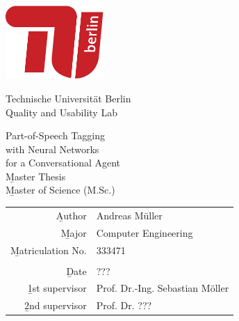 
\pagestyle{empty}

\clearscrheadings\clearscrplain
\begin{center}
\includegraphics[width=0.28\textwidth]{images/logo_tu_berlin}
\vspace{8mm}

{\huge Technische Universität Berlin}\\
\vspace{2mm}
{\large Quality and Usability Lab}\\
\vspace{11mm}

{\Huge Part-of-Speech Tagging\\[-2mm] with Neural Networks\\[-2mm] for a Conversational Agent\\}
\vspace{20mm}
{\Huge \b{Master Thesis}}\\
{\b{Master of Science (M.Sc.)}}\\
\vspace{24mm}
\begin{tabular}{rl}
  \b{Author} & Andreas Müller\\
  \b{Major} & Computer Engineering\\
  \b{Matriculation No.} & 333471\\
   & \\
  \b{Date} & ??? \\
  \b{1st supervisor} & Prof. Dr.-Ing. Sebastian Möller \\
  \b{2nd supervisor} & Prof. Dr. ??? \\
\end{tabular}

\end{center}
\clearpage
\pagestyle{useheadings} %

